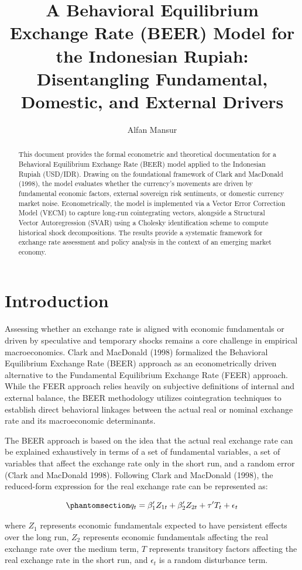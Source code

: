 \documentclass[
  manuscript=article,
  layout=publish,
  year=2026,
  volume=6,
]{den}
\title{A Behavioral Equilibrium Exchange Rate (BEER) Model for the
Indonesian Rupiah: Disentangling Fundamental, Domestic, and External
Drivers}
\author{Alfan Mansur \orcid{0000-0001-8695-0514}}
\affiliation{Dewan Ekonomi Nasional}
\begin{document}
\begin{abstract}
This document provides the formal econometric and theoretical
documentation for a Behavioral Equilibrium Exchange Rate (BEER) model
applied to the Indonesian Rupiah (USD/IDR). Drawing on the foundational
framework of Clark and MacDonald (1998), the model evaluates whether the
currency's movements are driven by fundamental economic factors,
external sovereign risk sentiments, or domestic currency market noise.
Econometrically, the model is implemented via a Vector Error Correction
Model (VECM) to capture long-run cointegrating vectors, alongside a
Structural Vector Autoregression (SVAR) using a Cholesky identification
scheme to compute historical shock decompositions. The results provide a
systematic framework for exchange rate assessment and policy analysis in
the context of an emerging market economy.
\end{abstract}

\section{Introduction}\label{introduction}

Assessing whether an exchange rate is aligned with economic fundamentals
or driven by speculative and temporary shocks remains a core challenge
in empirical macroeconomics. Clark and MacDonald (1998) formalized the
Behavioral Equilibrium Exchange Rate (BEER) approach as an
econometrically driven alternative to the Fundamental Equilibrium
Exchange Rate (FEER) approach. While the FEER approach relies heavily on
subjective definitions of internal and external balance, the BEER
methodology utilizes cointegration techniques to establish direct
behavioral linkages between the actual real or nominal exchange rate and
its macroeconomic determinants.

The BEER approach is based on the idea that the actual real exchange
rate can be explained exhaustively in terms of a set of fundamental
variables, a set of variables that affect the exchange rate only in the
short run, and a random error (Clark and MacDonald 1998). Following
Clark and MacDonald (1998), the reduced-form expression for the real
exchange rate can be represented as:

\begin{equation}\phantomsection\label{eq-beer-general}{
q_t = \beta_1'Z_{1t} + \beta_2'Z_{2t} + \tau'T_t + \epsilon_t
}\end{equation}

where \(Z_1\) represents economic fundamentals expected to have
persistent effects over the long run, \(Z_2\) represents economic
fundamentals affecting the real exchange rate over the medium term,
\(T\) represents transitory factors affecting the real exchange rate in
the short run, and \(\epsilon_t\) is a random disturbance term.
\end{document}
